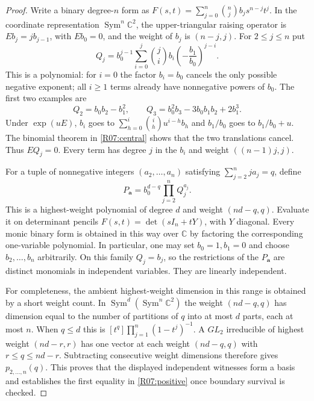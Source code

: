 \documentclass[11pt,a4paper]{article}
\theoremstyle{definition}\newtheorem{definition}{Definition}
\begin{document}
\begin{proof}
Write a binary degree-$n$ form as
$F(s,t)=\sum_{j=0}^n\binom nj b_j s^{n-j}t^j$.
In the coordinate representation $\operatorname{Sym}^n\mathbb C^2$,
the upper-triangular raising operator is
$E b_j=j b_{j-1}$, with $E b_0=0$, and the weight of $b_j$ is
$(n-j,j)$. For $2\leq j\leq n$ put
\begin{equation}\label{R07:central}
 Q_j=b_0^{j-1}\sum_{i=0}^j\binom ji b_i
                  \left(-\frac{b_1}{b_0}\right)^{j-i}.
\end{equation}
This is a polynomial: for $i=0$ the factor $b_i=b_0$ cancels the only
possible negative exponent; all $i\geq1$ terms already have
nonnegative powers of $b_0$. The first two examples are
\[
 Q_2=b_0b_2-b_1^2,\qquad
 Q_3=b_0^2b_3-3b_0b_1b_2+2b_1^3.
\]
Under $\exp(uE)$, $b_i$ goes to
$\sum_{h=0}^i\binom ih u^{i-h}b_h$ and $b_1/b_0$ goes to
$b_1/b_0+u$. The binomial theorem in \eqref{R07:central} shows that
the two translations cancel. Thus $E Q_j=0$. Every term has degree
$j$ in the $b_i$ and weight $((n-1)j,j)$.

For a tuple of nonnegative integers $(a_2,\ldots,a_n)$ satisfying
$\sum_{j=2}^n ja_j=q$, define
\begin{equation}\label{R07:witness}
 P_{\mathbf a}=b_0^{d-q}\prod_{j=2}^n Q_j^{a_j}.
\end{equation}
This is a highest-weight polynomial of degree $d$ and weight
$(nd-q,q)$. Evaluate it on determinant pencils
$F(s,t)=\det(sI_n+tY)$, with $Y$ diagonal. Every monic binary form
is obtained in this way over $\mathbb C$ by factoring the corresponding
one-variable polynomial. In particular, one may set $b_0=1,b_1=0$
and choose $b_2,\ldots,b_n$ arbitrarily. On this family $Q_j=b_j$,
so the restrictions of the $P_{\mathbf a}$ are distinct monomials
in independent variables. They are linearly independent.

For completeness, the ambient highest-weight dimension in this range
is obtained by a short weight count. In
$\operatorname{Sym}^d(\operatorname{Sym}^n\mathbb C^2)$ the weight
$(nd-q,q)$ has dimension equal to the number of partitions of $q$
into at most $d$ parts, each at most $n$. When $q\leq d$ this is
$[t^q]\prod_{j=1}^n(1-t^j)^{-1}$. A $GL_2$ irreducible of highest
weight $(nd-r,r)$ has one vector at each weight $(nd-q,q)$ with
$r\leq q\leq nd-r$. Subtracting consecutive weight dimensions
therefore gives $p_{2,\ldots,n}(q)$. This proves that the displayed
independent witnesses form a basis and establishes the first equality
in \eqref{R07:positive} once boundary survival is checked.


\end{proof}
\end{document}

